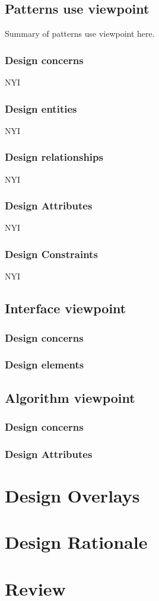 \documentclass[12pt]{article}
\begin{document}
        \subsection{Patterns use viewpoint}%
            Summary of patterns use viewpoint here.
            \subsubsection{Design concerns}
            NYI
            \subsubsection{Design entities}
            NYI
            \subsubsection{Design relationships}
            NYI
            \subsubsection{Design Attributes}
            NYI
            \subsubsection{Design  Constraints}
            NYI
            
        \subsection{Interface viewpoint}%
            \subsubsection{Design concerns}
               
            \subsubsection{Design elements}
                
        \subsection{Algorithm viewpoint}%
            \subsubsection{Design concerns}
             \subsubsection{Design Attributes}

\section{Design Overlays}
\section{Design Rationale}
\section{Review}

\normalsize
\end{document}
